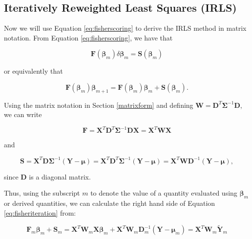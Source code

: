 \documentclass[
  12pt,
]{book}
\begin{document}
\subsection{Iteratively Reweighted Least Squares (IRLS)}\label{iteratively-reweighted-least-squares-irls}

Now we will use Equation \eqref{eq:fisherscoring} to derive the IRLS method in matrix notation. From Equation \eqref{eq:fisherscoring}, we have that

\begin{equation}
  \boldsymbol{F}(\boldsymbol{\beta}_{m})\delta\boldsymbol{\beta}_{m}
  = \boldsymbol{S}(\boldsymbol{\beta}_{m})
\end{equation}

or equivalently that

\begin{equation}
  \boldsymbol{F}(\boldsymbol{\beta}_{m})\boldsymbol{\beta}_{m+1}
  = \boldsymbol{F}(\boldsymbol{\beta}_{m})\boldsymbol{\beta}_{m} +
    \boldsymbol{S}(\boldsymbol{\beta}_{m}).
  \label{eq:fisheriteration}
\end{equation}

Using the matrix notation in Section \ref{matrixform} and defining \(\boldsymbol{W} = \boldsymbol{D}^{T}\boldsymbol{\Sigma}^{-1}\boldsymbol{D}\), we can write

\begin{equation}
  \boldsymbol{F}
  = \boldsymbol{X}^{T}\boldsymbol{D}^{T}\boldsymbol{\Sigma}^{-1}\boldsymbol{D}\boldsymbol{X}
  = \boldsymbol{X}^{T}\boldsymbol{W}\boldsymbol{X}
\end{equation}

and

\begin{equation}
  \boldsymbol{S}
  = \boldsymbol{X}^{T}\boldsymbol{D}\boldsymbol{\Sigma}^{-1}(\boldsymbol{Y} - \boldsymbol{\mu})
  = \boldsymbol{X}^{T}\boldsymbol{D}^T\boldsymbol{\Sigma}^{-1}(\boldsymbol{Y} - \boldsymbol{\mu})
  = \boldsymbol{X}^{T}\boldsymbol{W}\boldsymbol{D}^{-1}(\boldsymbol{Y} - \boldsymbol{\mu}),
\end{equation}

since \(\boldsymbol{D}\) is a diagonal matrix.

Thus, using the subscript \(m\) to denote the value of a quantity evaluated using \(\boldsymbol{\beta}_{m}\) or derived quantities, we can calculate the right hand side of Equation \eqref{eq:fisheriteration} from:

\begin{equation}
  \boldsymbol{F}_{m}\boldsymbol{\beta}_{m} + \boldsymbol{S}_{m}
  = \boldsymbol{X}^{T}\boldsymbol{W}_{m}\boldsymbol{X}\boldsymbol{\beta}_{m} +
    \boldsymbol{X}^{T}\boldsymbol{W}_{m}\boldsymbol{D}_{m}^{-1}(\boldsymbol{Y} - \boldsymbol{\mu}_{m})
  = \boldsymbol{X}^{T}\boldsymbol{W}_{m}\boldsymbol{\tilde{Y}}_{m}
\end{equation}
\end{document}
